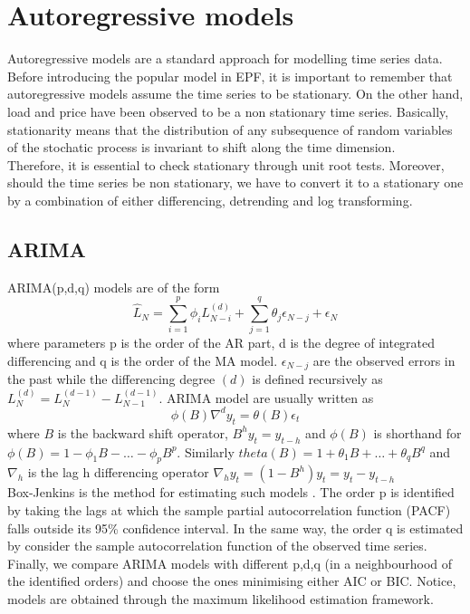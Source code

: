 \section{Autoregressive models}
Autoregressive models are a standard approach for modelling time series data.
Before introducing the popular model in EPF, it is important to remember that autoregressive models assume the time series to be stationary. On the other hand, load and price have been observed to be a non stationary time series. 
Basically, stationarity means that the distribution of any subsequence of random variables of the stochatic process is invariant to shift along the time dimension.
\\
Therefore, it is essential to check stationary through unit root tests. Moreover, should the time series be non stationary, we have to convert it to a stationary one by a combination of either differencing, detrending and log transforming.
\subsection{ARIMA}
ARIMA(p,d,q) models are of the form
\begin{equation}
    \hat{L}_N=\sum\limits_{i=1}^{p}\phi_i L_{N-i}^{(d)}+\sum\limits_{j=1}^{q}\theta_j \epsilon_{N-j}+\epsilon_N
\end{equation}
where parameters p is the order of the AR part, d is the degree of integrated differencing and q is the order of the MA model. $\epsilon_{N-j}$ are the observed errors in the past while the differencing degree $(d)$ is defined recursively as $L_N^{(d)}=L_N^{(d-1)}-L_{N-1}^{(d-1)}$.
ARIMA model are usually written as
\begin{equation}
    \phi(B)\nabla^d y_t=\theta(B)\epsilon_t
\end{equation}
where $B$ is the backward shift operator, $B^h y_t=y_{t-h}$ and $\phi(B)$ is shorthand for $\phi(B)=1-\phi_1B-\dots-\phi_p B^p$.
Similarly $theta(B)=1+\theta_1B+\dots+\theta_q B^q$ and $\nabla_h$ is the lag h differencing operator $\nabla_h y_t=(1-B^h)y_t=y_t-y_{t-h}$
\\
Box-Jenkins is the method for estimating such models \cite{box2015time}.
The order p is identified by taking the lags at which the sample partial autocorrelation function (PACF) falls outside its 95\% confidence interval.
In the same way, the order q is estimated by consider the sample autocorrelation function of the observed time series. Finally, we compare ARIMA models with different p,d,q (in a neighbourhood of the identified orders) and choose the ones minimising either AIC or BIC. Notice, models are obtained through the maximum likelihood estimation framework.

